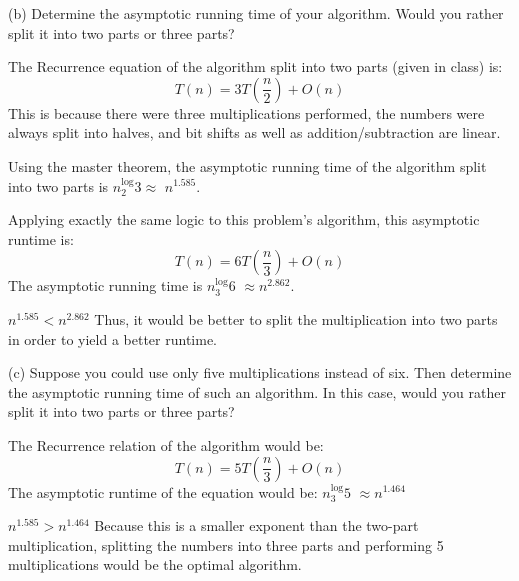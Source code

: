 \documentclass[11pt, solution, letterpaper]{format}
\begin{document}
(b) Determine the asymptotic running time of your algorithm. Would you rather split it into two parts or three parts?

The Recurrence equation of the algorithm split into two parts (given in class) is: $$T(n) = 3T(\frac{n}{2}) + O(n)$$
This is because there were three multiplications performed, the numbers were always split into halves, and bit shifts as well as addition/subtraction are linear.

Using the master theorem, the asymptotic running time of the algorithm split into two parts is $n^\log_2{3} \approx $ $n^{1.585}$.


Applying exactly the same logic to this problem's algorithm, this asymptotic runtime is: 
$$T(n) = 6T(\frac{n}{3}) + O(n)$$
The asymptotic running time is $n^\log_3{6} $ $\approx n^{2.862}$.

$n^{1.585} < n^{2.862}$
Thus, it would be better to split the multiplication into two parts in order to yield a better runtime.

(c) Suppose you could use only five multiplications instead of six. Then determine the asymptotic running time of
such an algorithm. In this case, would you rather split it into two parts or three parts?

The Recurrence relation of the algorithm would be:
$$T(n) = 5T(\frac{n}{3}) + O(n)$$
The asymptotic runtime of the equation would be: $n^\log_3{5}$ $ \approx n^{1.464}$ 

$n^{1.585} > n^{1.464}$
Because this is a smaller exponent than the two-part multiplication, splitting the numbers into three parts and performing 5 multiplications would be the optimal algorithm.
\end{document}
